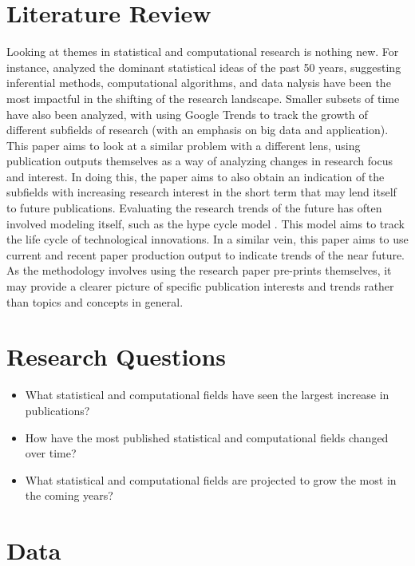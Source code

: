 \documentclass[
  12pt]{article}
\providecommand{\tightlist}{%
  \setlength{\itemsep}{0pt}\setlength{\parskip}{0pt}}\usepackage{longtable,booktabs,array}
\begin{document}
\section{Literature Review}\label{lit-review}

Looking at themes in statistical and computational research is nothing
new. For instance, \citet{gelm:veht:2021} analyzed the dominant
statistical ideas of the past 50 years, suggesting inferential methods,
computational algorithms, and data nalysis have been the most impactful
in the shifting of the research landscape. Smaller subsets of time have
also been analyzed, with \citet{jun:yoo:choi:2018} using Google Trends
to track the growth of different subfields of research (with an emphasis
on big data and application). This paper aims to look at a similar
problem with a different lens, using publication outputs themselves as a
way of analyzing changes in research focus and interest. In doing this,
the paper aims to also obtain an indication of the subfields with
increasing research interest in the short term that may lend itself to
future publications. Evaluating the research trends of the future has
often involved modeling itself, such as the hype cycle model
\citet{dedehayir:2016}. This model aims to track the life cycle of
technological innovations. In a similar vein, this paper aims to use
current and recent paper production output to indicate trends of the
near future. As the methodology involves using the research paper
pre-prints themselves, it may provide a clearer picture of specific
publication interests and trends rather than topics and concepts in
general.

\section{Research Questions}\label{sec-questions}

\begin{itemize}
\tightlist
\item
  What statistical and computational fields have seen the largest
  increase in publications?
\item
  How have the most published statistical and computational fields
  changed over time?
\item
  What statistical and computational fields are projected to grow the
  most in the coming years?
\end{itemize}

\section{Data}\label{sec-data}
\end{document}
